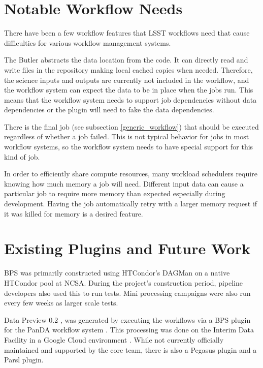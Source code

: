 \documentclass[11pt,twoside]{article}
\begin{document}
\section{Notable Workflow Needs}
There have been a few workflow features that LSST workflows need that
cause difficulties for various workflow management systems.

The Butler abstracts the data location from the code.  It can directly
read and write files in the repository making local cached copies
when needed.  Therefore, the science inputs and outputs are currently
not included in the workflow, and the workflow system can expect the
data to be in place when the jobs run.  This means that the workflow
system needs to support job dependencies without data dependencies or
the plugin will need to fake the data dependencies.

There is the final job (see subsection \ref{generic_workflow}) that should be
executed regardless of whether a job failed.  This is not typical behavior
for jobs in most workflow systems, so the workflow system needs to have
special support for this kind of job.

In order to efficiently share compute resources, many workload schedulers
require knowing how much memory a job will need.  Different input data can
cause a particular job to require more memory than expected especially
during development.  Having the job automatically retry with a larger
memory request if it was killed for memory is a desired feature.

\section{Existing Plugins and Future Work}
BPS was primarily constructed using HTCondor's \citep{10.1002/cpe.938}
DAGMan on a native HTCondor pool at NCSA.  During the project's
construction period, pipeline developers also used this to run tests.
Mini processing campaigns were also run every few weeks as larger
scale tests.

Data Preview 0.2 \citep[DP0.2;][]{RTN-039}, was generated by
executing the workflows via a BPS plugin for the PanDA workflow system
\citep{10.1088/1742-6596/331/7/072024}.  This processing was done on
the Interim Data Facility in a Google Cloud environment \citep{2021arXiv211115030O}.
While not currently officially maintained and supported by the core team,
there is also a Pegasus \citep{10.1016/j.future.2014.10.008} plugin and
a Parsl \citep{10.1145/3307681.3325400} plugin.
\end{document}
